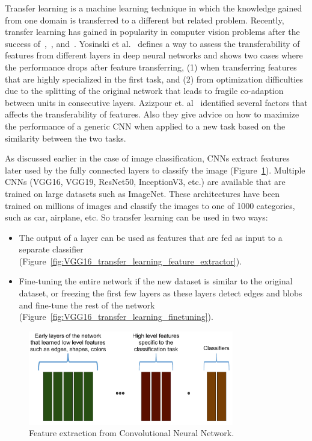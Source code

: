 Transfer learning is a machine learning technique in which the knowledge gained from one domain is transferred to a different but related problem. Recently, transfer learning has gained in popularity in computer vision problems after the success of~\cite{donahue2014decaf},~\cite{razavian2014cnn}, and~\cite{sermanet2013overfeat}. Yosinski et al.~\cite{yosinski2014transferable} defines a way to assess the transferability of features from different layers in deep neural networks and shows two cases where the performance drops after feature transferring, (1) when transferring features that are highly specialized in the first task, and (2) from optimization difficulties due to the splitting of the original network that leads to fragile co-adaption between units in consecutive layers. Azizpour et. al~\cite{azizpour2016factors} identified several factors that affects the transferability of features. Also they give advice on how to maximize the performance of a generic CNN when applied to a new task based on the similarity between the two tasks.

As discussed earlier in the case of image classification, CNNs extract features later used by the fully connected layers to classify the image (Figure~\ref{fig:transfer_learning}). Multiple CNNs (VGG16, VGG19, ResNet50, InceptionV3, etc.)  are available that are trained on large datasets such as ImageNet. These architectures have been trained on millions of images and classify the images to one of 1000 categories, such as car, airplane, etc. So transfer learning can be used in two ways:

\begin{itemize}
  \item The output of a layer can be used as features that are fed as input to a separate classifier (Figure~\ref{fig:VGG16_transfer_learning_feature_extractor}).
  \item Fine-tuning the entire network if the new dataset is similar to the original dataset, or freezing the first few layers as these layers detect edges and blobs and fine-tune the rest of the network (Figure~\ref{fig:VGG16_transfer_learning_finetuning}).
\end{itemize} 

\begin{figure}[]
    \begin{center}
    \includegraphics[width=0.8\textwidth]{images/transfer_learning.pdf}
    \end{center}
    \caption{Feature extraction from Convolutional Neural Network.} \label{fig:transfer_learning}
\end{figure}

